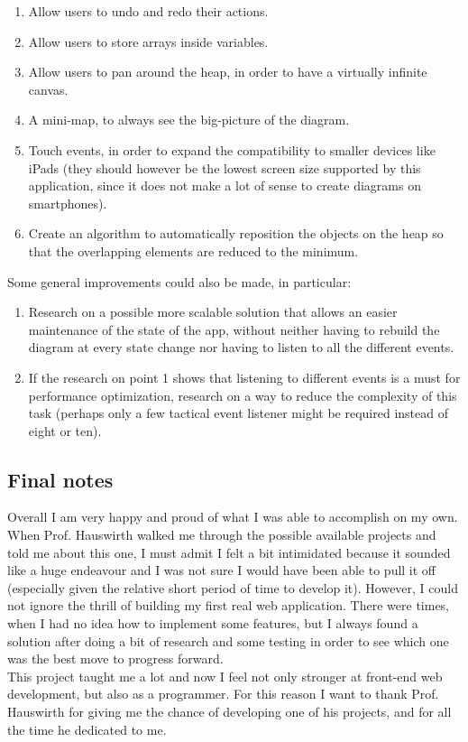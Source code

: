 \documentclass[]{usiinfbachelorproject}
\begin{document}
\begin{enumerate}
	\item Allow users to undo and redo their actions.
	\item Allow users to store arrays inside variables.
	\item Allow users to pan around the heap, in order to have a virtually infinite canvas.
	\item A mini-map, to always see the big-picture of the diagram.
	\item Touch events, in order to expand the compatibility to 	smaller devices like iPads (they should however be the lowest screen size supported by this application, since it does not make a lot of sense to create diagrams on smartphones).
	\item Create an algorithm to automatically reposition the objects on the heap so that the overlapping elements are reduced to the minimum.
\end{enumerate}

\noindent Some general improvements could also be made, in particular:

\begin{enumerate}
	\item Research on a possible more scalable solution that allows an easier maintenance of the state of the app, without neither having to rebuild the diagram at every state change nor having to listen to all the different events.
	\item If the research on point 1 shows that listening to different events is a must for performance optimization, research on a way to reduce the complexity of this task (perhaps only a few tactical event listener might be required instead of eight or ten).
\end{enumerate}

\subsection{Final notes}

Overall I am very happy and proud of what I was able to accomplish on my own. When Prof. Hauswirth walked me through the possible available projects and told me about this one, I must admit I felt a bit intimidated because it sounded like a huge endeavour and I was not sure I would have been able to pull it off (especially given the relative short period of time to develop it). However, I could not ignore the thrill of building my first real web application. There were times, when I had no idea how to implement some features, but I always found a solution after doing a bit of research and some testing in order to see which one was the best move to progress forward.\\
This project taught me a lot and now I feel not only stronger at front-end web development, but also as a programmer. For this reason I want to thank Prof. Hauswirth for giving me the chance of developing one of his projects, and for all the time he dedicated to me.

\vspace{\fill}

\pagebreak



\end{document}
